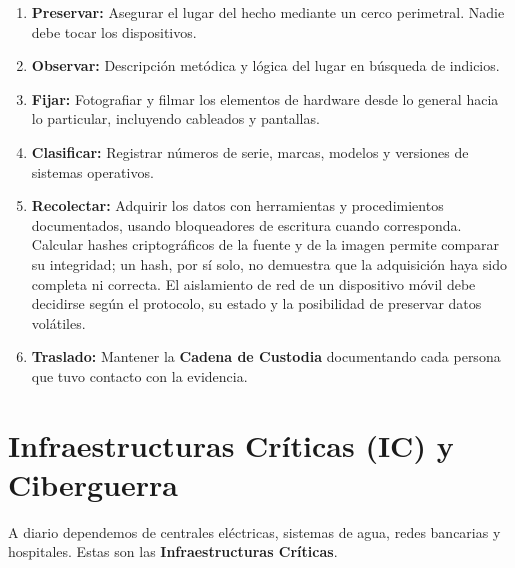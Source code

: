 \documentclass[11pt,a4paper]{article}
\begin{document}
\begin{forense}
\begin{enumerate}[leftmargin=*]
  \item \textbf{Preservar:} Asegurar el lugar del hecho mediante un cerco perimetral. Nadie debe tocar los dispositivos.
  \item \textbf{Observar:} Descripción metódica y lógica del lugar en búsqueda de indicios.
  \item \textbf{Fijar:} Fotografiar y filmar los elementos de hardware desde lo general hacia lo particular, incluyendo cableados y pantallas.
  \item \textbf{Clasificar:} Registrar números de serie, marcas, modelos y versiones de sistemas operativos.
  \item \textbf{Recolectar:} Adquirir los datos con herramientas y procedimientos documentados, usando bloqueadores de escritura cuando corresponda. Calcular hashes criptográficos de la fuente y de la imagen permite comparar su integridad; un hash, por sí solo, no demuestra que la adquisición haya sido completa ni correcta. El aislamiento de red de un dispositivo móvil debe decidirse según el protocolo, su estado y la posibilidad de preservar datos volátiles.
  \item \textbf{Traslado:} Mantener la \textbf{Cadena de Custodia} documentando cada persona que tuvo contacto con la evidencia.
\end{enumerate}
\end{forense}

\section{Infraestructuras Críticas (IC) y Ciberguerra}
A diario dependemos de centrales eléctricas, sistemas de agua, redes bancarias y hospitales. Estas son las \textbf{Infraestructuras Críticas}.
\end{document}
